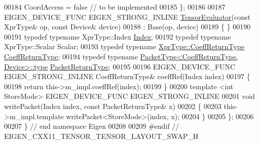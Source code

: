 \begin{DoxyCode}
00184     CoordAccess = \textcolor{keyword}{false}  \textcolor{comment}{// to be implemented}
00185   \};
00186 
00187   EIGEN\_DEVICE\_FUNC EIGEN\_STRONG\_INLINE \hyperlink{struct_eigen_1_1_tensor_evaluator}{TensorEvaluator}(\textcolor{keyword}{const} XprType& op, \textcolor{keyword}{const} Device& 
      device)
00188     : Base(op, device)
00189   \{ \}
00190 
00191   \textcolor{keyword}{typedef} \textcolor{keyword}{typename} XprType::Index \hyperlink{namespace_eigen_a62e77e0933482dafde8fe197d9a2cfde}{Index};
00192   \textcolor{keyword}{typedef} \textcolor{keyword}{typename} XprType::Scalar Scalar;
00193   \textcolor{keyword}{typedef} \textcolor{keyword}{typename} \hyperlink{group___sparse_core___module}{XprType::CoeffReturnType} 
      \hyperlink{group___sparse_core___module}{CoeffReturnType};
00194   \textcolor{keyword}{typedef} \textcolor{keyword}{typename} \hyperlink{group___sparse_core___module}{PacketType<CoeffReturnType, Device>::type} 
      \hyperlink{group___sparse_core___module}{PacketReturnType};
00195 
00196   EIGEN\_DEVICE\_FUNC EIGEN\_STRONG\_INLINE CoeffReturnType& coeffRef(Index index)
00197   \{
00198     \textcolor{keywordflow}{return} this->m\_impl.coeffRef(index);
00199   \}
00200   \textcolor{keyword}{template} <\textcolor{keywordtype}{int} StoreMode> EIGEN\_DEVICE\_FUNC EIGEN\_STRONG\_INLINE
00201   \textcolor{keywordtype}{void} writePacket(Index index, \textcolor{keyword}{const} PacketReturnType& x)
00202   \{
00203     this->m\_impl.template writePacket<StoreMode>(index, x);
00204   \}
00205 \};
00206 
00207 \} \textcolor{comment}{// end namespace Eigen}
00208 
00209 \textcolor{preprocessor}{#endif // EIGEN\_CXX11\_TENSOR\_TENSOR\_LAYOUT\_SWAP\_H}
\end{DoxyCode}
